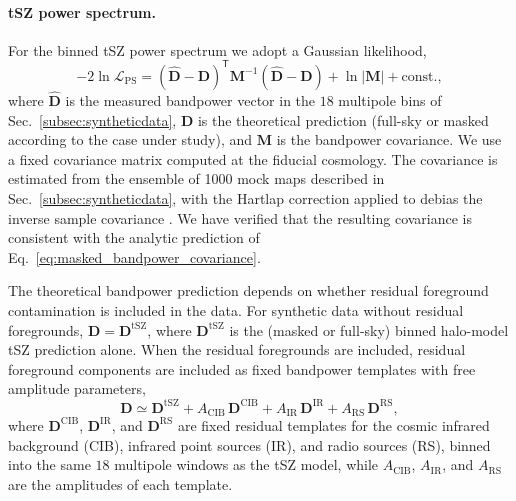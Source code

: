 \documentclass[aps,prd,twocolumn,superscriptaddress,nofootinbib,floatfix]{revtex4-2}
\begin{document}
\paragraph{tSZ power spectrum.}
For the binned tSZ power spectrum we adopt a Gaussian likelihood,
\begin{equation}
-2\ln\mathcal{L}_{\mathrm{PS}}
=
\left(\hat{\bm{D}}-\bm{D}\right)^{\mathsf T}
\bm{M}^{-1}
\left(\hat{\bm{D}}-\bm{D}\right)
+\ln|\bm{M}|
+\mathrm{const.},
\label{eq:lnLPS}
\end{equation}
where $\hat{\bm{D}}$ is the measured bandpower vector in the $18$ multipole bins of Sec.~\ref{subsec:syntheticdata}, $\bm{D}$ is the theoretical prediction (full-sky or masked according to the case under study), and $\bm{M}$ is the bandpower covariance. We use a fixed covariance matrix computed at the fiducial cosmology. The covariance is estimated from the ensemble of 1000 mock maps described in Sec.~\ref{subsec:syntheticdata}, with the Hartlap correction applied to debias the inverse sample covariance \citep{Hartlap2007}. We have verified that the resulting covariance is consistent with the analytic prediction of Eq.~\ref{eq:masked_bandpower_covariance}.

The theoretical bandpower prediction depends on whether residual foreground contamination is included in the data. For synthetic data without residual foregrounds, $\bm{D}=\bm{D}^{\mathrm{tSZ}}$, where $\bm{D}^{\mathrm{tSZ}}$ is the (masked or full-sky) binned halo-model tSZ prediction alone. When the residual foregrounds are included, residual foreground components are included as fixed bandpower templates with free amplitude parameters,
\begin{equation}
\bm{D}
\simeq
\bm{D}^{\mathrm{tSZ}}
+
A_{\mathrm{CIB}}\,\bm{D}^{\mathrm{CIB}}
+
A_{\mathrm{IR}}\,\bm{D}^{\mathrm{IR}}
+
A_{\mathrm{RS}}\,\bm{D}^{\mathrm{RS}},
\label{eq:fg_model}
\end{equation}
where $\bm{D}^{\mathrm{CIB}}$, $\bm{D}^{\mathrm{IR}}$, and $\bm{D}^{\mathrm{RS}}$ are fixed residual templates for the cosmic infrared background (CIB), infrared point sources (IR), and radio sources (RS), binned into the same $18$ multipole windows as the tSZ model, while $A_{\mathrm{CIB}}$, $A_{\mathrm{IR}}$, and $A_{\mathrm{RS}}$ are the amplitudes of each template.
\end{document}
